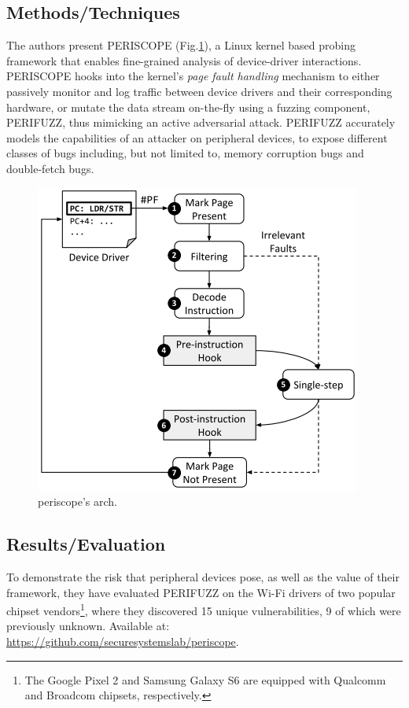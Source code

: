 \subsection{Methods/Techniques}
The authors present PERISCOPE (Fig.\ref{fig:periscope}), a Linux kernel based probing framework that enables fine-grained analysis of device-driver interactions. PERISCOPE hooks into the kernel’s \emph{page fault handling} mechanism to either passively monitor and log traffic between device drivers and their corresponding hardware, or mutate the data stream on-the-fly using a fuzzing component, PERIFUZZ, thus mimicking an active adversarial attack. PERIFUZZ accurately models the capabilities of an attacker on peripheral devices, to expose different classes of bugs including, but not limited to, memory corruption bugs and double-fetch bugs. 
\begin{figure}[h]
    \centering
    \includegraphics[width=0.7\linewidth]{periscope.png} %
    \caption{periscope's arch.}	
    \label{fig:periscope}
\end{figure}
\subsection{Results/Evaluation}
To demonstrate the risk that peripheral devices pose, as well as the value of their framework, they have evaluated PERIFUZZ on the Wi-Fi drivers of two popular chipset vendors\footnote{The Google Pixel 2 and Samsung Galaxy S6 are equipped with Qualcomm and Broadcom chipsets, respectively.}, where they discovered 15 unique vulnerabilities, 9 of which were previously unknown. Available at: \url{https://github.com/securesystemslab/periscope}.

